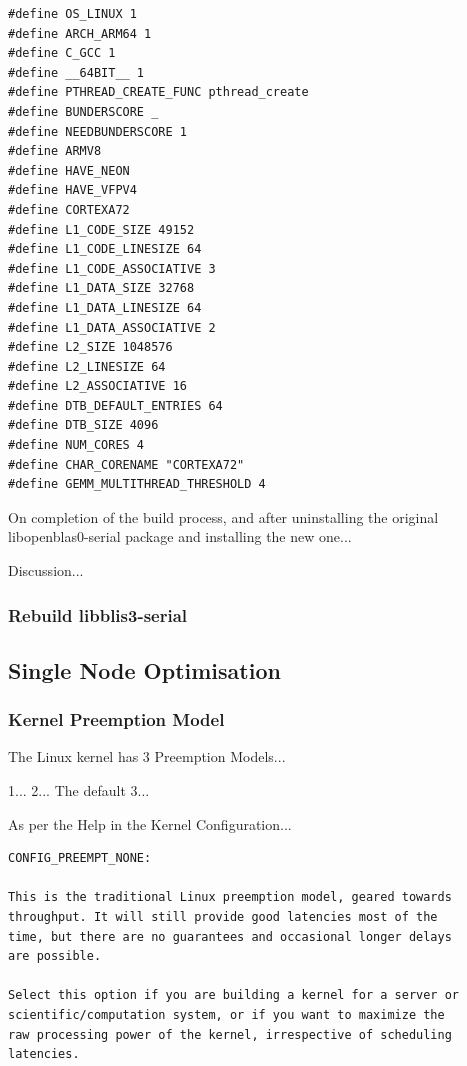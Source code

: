 \documentclass{report}
\begin{document}
\lstset{style=listingstyle}
\begin{lstlisting}[caption=0-serial/config.h]
#define OS_LINUX 1
#define ARCH_ARM64 1
#define C_GCC 1
#define __64BIT__ 1
#define PTHREAD_CREATE_FUNC pthread_create
#define BUNDERSCORE _
#define NEEDBUNDERSCORE 1
#define ARMV8
#define HAVE_NEON
#define HAVE_VFPV4
#define CORTEXA72
#define L1_CODE_SIZE 49152
#define L1_CODE_LINESIZE 64
#define L1_CODE_ASSOCIATIVE 3
#define L1_DATA_SIZE 32768
#define L1_DATA_LINESIZE 64
#define L1_DATA_ASSOCIATIVE 2
#define L2_SIZE 1048576
#define L2_LINESIZE 64
#define L2_ASSOCIATIVE 16
#define DTB_DEFAULT_ENTRIES 64
#define DTB_SIZE 4096
#define NUM_CORES 4
#define CHAR_CORENAME "CORTEXA72"
#define GEMM_MULTITHREAD_THRESHOLD 4
\end{lstlisting}


On completion of the build process, and after uninstalling the original libopenblas0-serial package and installing the new one...


Discussion...


%
%
\subsubsection{Rebuild libblis3-serial}


%
%
\subsection{Single Node Optimisation}


%
%
\subsubsection{Kernel Preemption Model}

The Linux kernel has 3 Preemption Models...

1...
2... The default
3...


As per the Help in the Kernel Configuration...

\lstset{style=listingstyle}
\begin{lstlisting}[numbers=none, caption=Kernel Configuration Preemption Model Help]
CONFIG_PREEMPT_NONE:                                                                                                                                                                                                                                                 

This is the traditional Linux preemption model, geared towards
throughput. It will still provide good latencies most of the
time, but there are no guarantees and occasional longer delays
are possible.                                                                                                                       

Select this option if you are building a kernel for a server or
scientific/computation system, or if you want to maximize the
raw processing power of the kernel, irrespective of scheduling
latencies.
\end{lstlisting}
\end{document}
